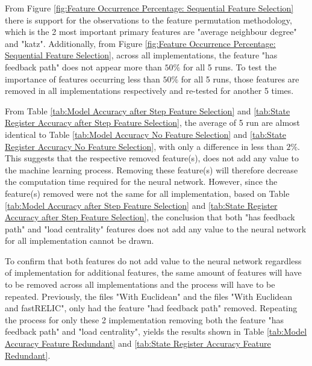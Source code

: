 \documentclass{tum-book}
\begin{document}
        \bigskip\noindent
        From Figure \ref{fig:Feature Occurrence Percentage: Sequential Feature Selection} there is support for the observations to the feature permutation methodology, which is the 2 most important primary features are "average neighbour degree" and "katz". Additionally, from Figure \ref{fig:Feature Occurrence Percentage: Sequential Feature Selection}, across all implementations, the feature "has feedback path" does not appear more than $50\%$ for all 5 runs. To test the importance of features occurring less than $50\%$ for all 5 runs, those features are removed in all implementations respectively and re-tested for another 5 times.
        
        \bigskip\noindent
        From Table \ref{tab:Model Accuracy after Step Feature Selection} and \ref{tab:State Register Accuracy after Step Feature Selection}, the average of 5 run are almost identical to Table \ref{tab:Model Accuracy No Feature Selection} and \ref{tab:State Register Accuracy No Feature Selection}, with only a difference in less than $2\%$. This suggests that the respective removed feature(s), does not add any value to the machine learning process. Removing these feature(s) will therefore decrease the computation time required for the neural network. However, since the feature(s) removed were not the same for all implementation, based on Table \ref{tab:Model Accuracy after Step Feature Selection} and \ref{tab:State Register Accuracy after Step Feature Selection}, the conclusion that both "has feedback path" and "load centrality" features does not add any value to the neural network for all implementation cannot be drawn.
        
       \bigskip\noindent
        To confirm that both features do not add value to the neural network regardless of implementation for additional features, the same amount of features will have to be removed across all implementations and the process will have to be repeated. Previously, the files "With Euclidean" and the files "With Euclidean and fastRELIC", only had the feature "had feedback path" removed. Repeating the process for only these 2 implementation removing both the feature "has feedback path" and "load centrality", yields the results shown in Table \ref{tab:Model Accuracy Feature Redundant} and \ref{tab:State Register Accuracy Feature Redundant}. 
        
        \begin{table}
            \centering
            
        \end{table}      
        
\end{document}
